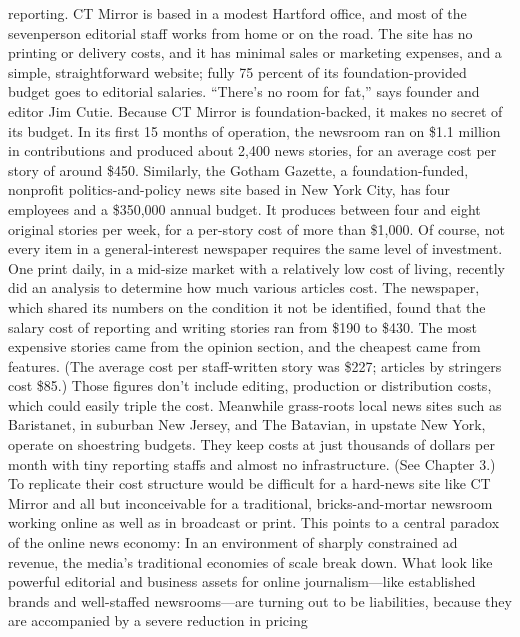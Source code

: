 reporting. CT Mirror is based in a modest Hartford office, and most of the sevenperson
editorial staff works from home or on the road. The site has no printing
or delivery costs, and it has minimal sales or marketing expenses, and a simple,
straightforward website; fully 75 percent of its foundation-provided budget goes
to editorial salaries. ``There's no room for fat,'' says founder and editor Jim Cutie.
Because CT Mirror is foundation-backed, it makes no secret of its budget.
In its first 15 months of operation, the newsroom ran on \$1.1 million in contributions
and produced about 2,400 news stories, for an average cost per story
of around \$450. Similarly, the Gotham Gazette, a foundation-funded, nonprofit
politics-and-policy news site based in New York City, has four employees and a
\$350,000 annual budget. It produces between four and eight original stories per
week, for a per-story cost of more than \$1,000.
Of course, not every item in a general-interest newspaper requires the same
level of investment. One print daily, in a mid-size market with a relatively low
cost of living, recently did an analysis to determine how much various articles
cost. The newspaper, which shared its numbers on the condition it not be identified,
found that the salary cost of reporting and writing stories ran from \$190
to \$430. The most expensive stories came from the opinion section, and the
cheapest came from features. (The average cost per staff-written story was \$227;
articles by stringers cost \$85.) Those figures don't include editing, production or
distribution costs, which could easily triple the cost.
Meanwhile grass-roots local news sites such as Baristanet, in suburban New
Jersey, and The Batavian, in upstate New York, operate on shoestring budgets.
They keep costs at just thousands of dollars per month with tiny reporting staffs
and almost no infrastructure. (See Chapter 3.) To replicate their cost structure
would be difficult for a hard-news site like CT Mirror and all but inconceivable
for a traditional, bricks-and-mortar newsroom working online as well as in
broadcast or print.
This points to a central paradox of the online news economy: In an environment
of sharply constrained ad revenue, the media's traditional economies of
scale break down. What look like powerful editorial and business assets for online
journalism—like established brands and well-staffed newsrooms—are turning
out to be liabilities, because they are accompanied by a severe reduction in pricing

